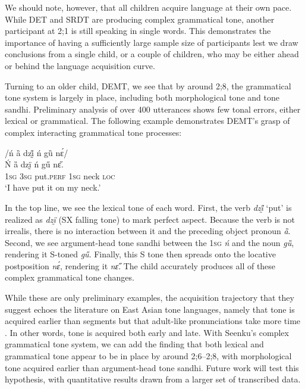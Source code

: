 \documentclass[output=paper,colorlinks,citecolor=brown,
]{langscibook}
\begin{document}
We should note, however, that all children acquire language at their own pace. While DET and SRDT are producing complex grammatical tone, another participant at 2;1 is still speaking in single words. This demonstrates the importance of having a sufficiently large sample size of participants lest we draw conclusions from a single child, or a couple of children, who may be either ahead or behind the language acquisition curve. 

Turning to an older child, DEMT, we see that by around 2;8, the grammatical tone system is largely in place, including both morphological tone and tone sandhi. Preliminary analysis of over 400 utterances shows few tonal errors, either lexical or grammatical. The following example demonstrates DEMT's grasp of complex interacting grammatical tone processes:

\ea 
\glll /ń ȁ dzḭ̋ ń gȕ nɛ́/ \\ 
Ń ȁ dzḭ̈ ń gű nɛ̋. \\
\textsc{1sg} \textsc{3sg} put.\textsc{perf} \textsc{1sg} neck \textsc{loc} \\
\glt `I have put it on my neck.' \\

\z

\noindent In the top line, we see the lexical tone of each word. First, the verb \textit{dzḭ̋} `put' is realized as \textit{dzḭ̈} (SX falling tone) to mark perfect aspect. Because the verb is not irrealis, there is no interaction between it and the preceding object pronoun \textit{ȁ}. Second, we see argument-head tone sandhi between the \textsc{1sg} \textit{ń} and the noun \textit{gȕ}, rendering it S-toned \textit{gű}. Finally, this S tone then spreads onto the locative postposition \textit{nɛ́}, rendering it \textit{nɛ̋}. The child accurately produces all of these complex grammatical tone changes. 

While these are only preliminary examples, the acquisition trajectory that they suggest echoes the literature on East Asian tone languages, namely that tone is acquired earlier than segments but that adult-like pronunciations take more time \citep{Wong12}. In other words, tone is acquired both early and late. With Seenku's complex grammatical tone system, we can add the finding that both lexical and grammatical tone appear to be in place by around 2;6--2;8, with morphological tone acquired earlier than argument-head tone sandhi. Future work will test this hypothesis, with quantitative results drawn from a larger set of transcribed data. 
\end{document}
